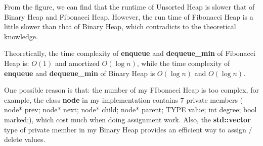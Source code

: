 \documentclass[12pt,a4paper]{article}
\theoremstyle{definition}
\begin{document}
From the figure, we can find that the runtime of Unsorted Heap is slower that of Binary Heap and Fibonacci Heap. However, the run time of  Fibonacci Heap is a little slower than that of Binary Heap, which contradicts to the theoretical knowledge.

Theoretically, the time complexity of \textbf{enqueue} and \textbf{dequeue\_min} of Fibonacci Heap is: $O(1)$ and amortized $O(\log n)$, while 
the time complexity of \textbf{enqueue} and \textbf{dequeue\_min} of Binary Heap is $O(\log n)$ and $O(\log n)$. 

One possible reason is that: the number of my FIbonacci Heap is too complex, for example, the class \textbf{node} in my implementation contains 7 private members (  node* prev;
node* next;
node* child;
node* parent;
TYPE value;
int degree;
bool marked;), which cost much when doing assignment work. Also, the \textbf{std::vector} type of private member in my Binary Heap provides an efficient way to assign / delete values.

\newpage
\end{document}
